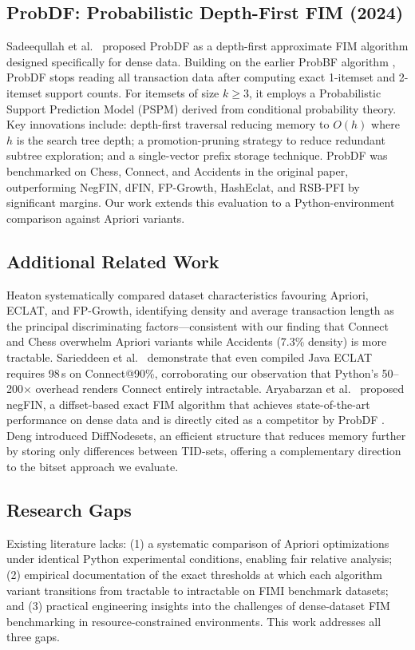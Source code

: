 \documentclass[conference]{IEEEtran}
\begin{document}
\subsection{ProbDF: Probabilistic Depth-First FIM (2024)}
Sadeequllah et al.\ \cite{probdf2024} proposed ProbDF as a depth-first
approximate FIM algorithm designed specifically for dense data. Building
on the earlier ProbBF algorithm \cite{probdf2024}, ProbDF stops reading
all transaction data after computing exact 1-itemset and 2-itemset support
counts. For itemsets of size $k \geq 3$, it employs a Probabilistic
Support Prediction Model (PSPM) derived from conditional probability
theory. Key innovations include: depth-first traversal reducing memory
to $O(h)$ where $h$ is the search tree depth; a promotion-pruning
strategy to reduce redundant subtree exploration; and a single-vector
prefix storage technique. ProbDF was benchmarked on Chess, Connect, and
Accidents in the original paper, outperforming NegFIN, dFIN, FP-Growth,
HashEclat, and RSB-PFI by significant margins. Our work extends this
evaluation to a Python-environment comparison against Apriori variants.

\subsection{Additional Related Work}
Heaton \cite{heaton2017} systematically compared dataset characteristics
favouring Apriori, ECLAT, and FP-Growth, identifying density and average
transaction length as the principal discriminating factors---consistent
with our finding that Connect and Chess overwhelm Apriori variants while
Accidents (7.3\% density) is more tractable. Sarieddeen et al.\
\cite{shfim2022} demonstrate that even compiled Java ECLAT requires
98\,s on Connect@90\%, corroborating our observation that Python's
50--200$\times$ overhead renders Connect entirely intractable.
Aryabarzan et al.\ \cite{negfin2018} proposed negFIN, a diffset-based
exact FIM algorithm that achieves state-of-the-art performance on dense
data and is directly cited as a competitor by ProbDF \cite{probdf2024}.
Deng \cite{dfin2016} introduced DiffNodesets, an efficient structure that
reduces memory further by storing only differences between TID-sets,
offering a complementary direction to the bitset approach we evaluate.

\subsection{Research Gaps}
Existing literature lacks: (1) a systematic comparison of Apriori
optimizations under identical Python experimental conditions, enabling
fair relative analysis; (2) empirical documentation of the exact
thresholds at which each algorithm variant transitions from tractable to
intractable on FIMI benchmark datasets; and (3) practical engineering
insights into the challenges of dense-dataset FIM benchmarking in
resource-constrained environments. This work addresses all three gaps.
\end{document}
